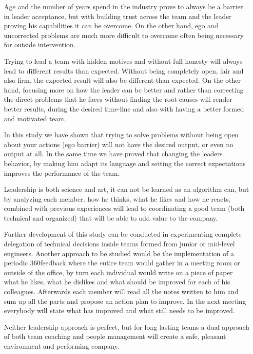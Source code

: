 Age and the number of years spend in the industry prove to always be a barrier in leader acceptance, but with building trust across the team and the leader proving his capabilities it can be overcome. On the other hand, ego and uncorrected problems are much more difficult to overcome often being necessary for outside intervention.

Trying to lead a team with hidden motives and without full honesty will always lead to different results than expected. Without being completely open, fair and also firm, the expected result will also be different than expected. On the other hand, focusing more on how the leader can be better and rather than correcting the direct problems that he faces without finding the root causes will render better results, during the desired time-line and also with having a better formed and motivated team.

In this study we have shown that trying to solve problems without being open about your actions (ego barrier) will not have the desired output, or even no output at all. In the same time we have proved that changing the leaders behavior, by making him adapt its language and setting the correct expectations improves the performance of the team.

Leadership is both science and art, it can not be learned as an algorithm can, but by analyzing each member, how he thinks, what he likes and how he reacts, combined with previous experiences will lead to coordinating a good team (both technical and organized) that will be able to add value to the company.

Further development of this study can be conducted in experimenting complete delegation of technical decisions inside teams formed from junior or mid-level engineers. Another approach to be studied would be the implementation of a periodic 360\textdegree feedback where the entire team would gather in a meeting room or outside of the office, by turn each individual would  write on a piece of paper what he likes, what he dislikes and what should be improved for each of his colleagues. Afterwards each member will read all the notes written to him and sum up all the parts and propose an action plan to improve. In the next meeting everybody will state what has improved and what still needs to be improved.

Neither leadership approach is perfect, but for long lasting teams a dual approach of both team coaching and people management will create a safe, pleasant environment and performing company.